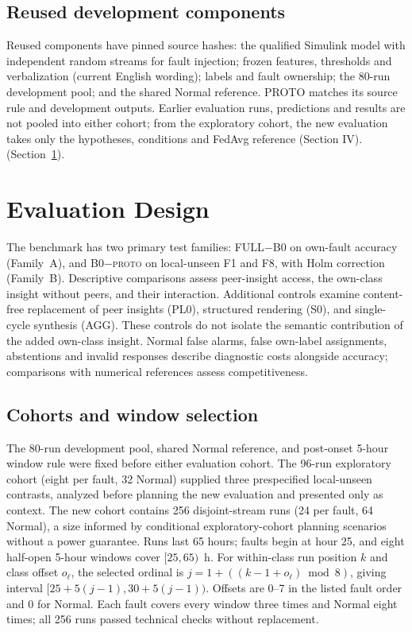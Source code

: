 \documentclass[conference]{IEEEtran}
\newcommand{\PROTO}{\textsc{proto}}
\newcommand{\cond}[1]{\textsf{#1}}
\begin{document}
\subsection{Reused development components}
\label{sec:provenance}
Reused components have pinned source hashes: the qualified Simulink model with independent random streams for fault injection; frozen features, thresholds and verbalization (current English wording); labels and fault ownership; the 80-run development pool; and the shared Normal reference. PROTO matches its source rule and development outputs. Earlier evaluation runs, predictions and results are not pooled into either cohort; from the exploratory cohort, the new evaluation takes only the hypotheses, conditions and FedAvg reference (Section IV).(Section~\ref{sec:protocol}).

\section{Evaluation Design}
\label{sec:protocol}
The benchmark has two primary test families:
\cond{FULL}$-$\cond{B0} on own-fault accuracy (Family~A), and
\cond{B0}$-$\PROTO{} on local-unseen F1 and F8, with Holm correction
(Family~B).
Descriptive comparisons assess peer-insight access, the own-class
insight without peers, and their interaction.
Additional controls examine content-free replacement of peer insights
(\cond{PL0}), structured rendering (\cond{S0}), and single-cycle
synthesis (\cond{AGG}).
These controls do not isolate the semantic contribution of the added
own-class insight.
Normal false alarms, false own-label assignments, abstentions and
invalid responses describe diagnostic costs alongside accuracy;
comparisons with numerical references assess competitiveness.

\subsection{Cohorts and window selection}
The 80-run development pool, shared Normal reference, and post-onset 5-hour window rule were fixed before either evaluation cohort. The 96-run exploratory cohort (eight per fault, 32 Normal) supplied three prespecified local-unseen contrasts, analyzed before planning the new evaluation and presented only as context. The new cohort contains 256 disjoint-stream runs (24 per fault, 64 Normal), a size informed by conditional exploratory-cohort planning scenarios without a power guarantee. Runs last 65 hours; faults begin at hour 25, and eight half-open 5-hour windows cover $[25,65)$~h. For within-class run position $k$ and class offset $o_\ell$, the selected ordinal is $j=1+((k-1+o_\ell)\bmod 8)$, giving interval $[25+5(j-1),30+5(j-1))$. Offsets are 0--7 in the listed fault order and 0 for Normal. Each fault covers every window three times and Normal eight times; all 256 runs passed technical checks without replacement.
\end{document}
